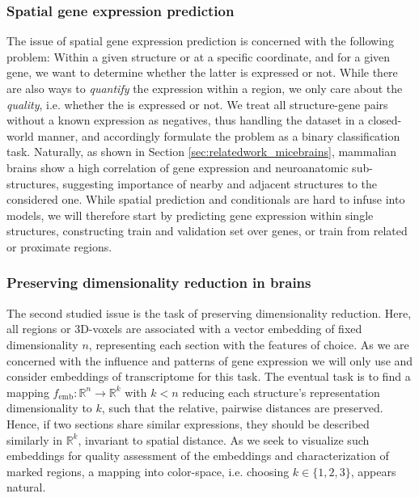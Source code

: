 \documentclass[]{article}
\begin{document}
\subsubsection{Spatial gene expression prediction}
\label{sec:probdesc_geneexp}
The issue of spatial gene expression prediction is concerned with the following problem: Within a given structure or at a specific coordinate, and for a given gene, we want to determine whether the latter is expressed or not. While there are also ways to \textit{quantify} the expression within a region, we only care about the \textit{quality}, i.e. whether the is expressed or not. We treat all structure-gene pairs without a known expression as negatives, thus handling the dataset in a closed-world manner, and accordingly formulate the problem as a binary classification task. Naturally, as shown in Section \ref{sec:relatedwork_micebrains}, mammalian brains show a high correlation of gene expression and neuroanatomic sub-structures, suggesting importance of nearby and adjacent structures to the considered one. While spatial prediction and conditionals are hard to infuse into models, we will therefore start by predicting gene expression within single structures, constructing train and validation set over genes, or train from related or proximate regions.

\subsubsection{Preserving dimensionality reduction in brains}
\label{sec:probdesc_dimpres}
The second studied issue is the task of preserving dimensionality reduction. Here, all regions or 3D-voxels are associated with a vector embedding of fixed dimensionality $n$, representing each section with the features of choice. As we are concerned with the influence and patterns of gene expression we will only use and consider embeddings of transcriptome for this task. The eventual task is to find a mapping $f_{\text{emb}}:\mathbb{R}^n \rightarrow \mathbb{R}^k$ with $k<n$ reducing each structure's representation dimensionality to $k$, such that the relative, pairwise distances are preserved. Hence, if two sections share similar expressions, they should be described similarly in $\mathbb{R}^k$, invariant to spatial distance. As we seek to visualize such embeddings for quality assessment of the embeddings and characterization of marked regions, a mapping into color-space, i.e. choosing $k\in\{1,2,3\}$, appears natural.
\end{document}
